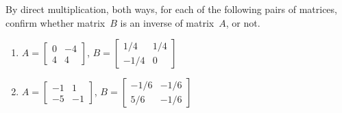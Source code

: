 




\begin{comment}
Could have a section on GF(2): that is, inverses of 0-1 matrices mod 2??  Relevant to computer science encoding and encryption---somehow.  \script supports modular computation via gf() something and some package, respectively.
\end{comment}





\sectionExercises


\begin{exercise} \label{ex:abinv} 
By direct multiplication, both ways, for each of the following pairs of matrices, confirm whether matrix~\(B\) is an inverse of matrix~\(A\), or not.
\begin{enumerate}
\item \(A=\begin{bmatrix} 0&-4
\\4&4 \end{bmatrix}\), 
\(B=\begin{bmatrix} 1/4&1/4
\\-1/4&0 \end{bmatrix}\)


\item \(A=\begin{bmatrix} -1&1
\\-5&-1 \end{bmatrix}\), 
\(B=\begin{bmatrix} -1/6&-1/6
\\5/6&-1/6 \end{bmatrix}\)


\end{enumerate}
\end{exercise}
